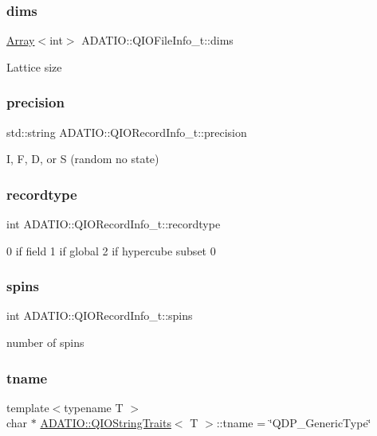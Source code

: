 \subsubsection{\texorpdfstring{dims}{dims}}
{\footnotesize\ttfamily \mbox{\hyperlink{classXMLArray_1_1Array}{Array}}$<$int$>$ A\+D\+A\+T\+I\+O\+::\+Q\+I\+O\+File\+Info\+\_\+t\+::dims}

Lattice size \mbox{\label{group__qio_gaba8466af5dd242de9e6d63fc5112e6df}} 
\subsubsection{\texorpdfstring{precision}{precision}}
{\footnotesize\ttfamily std\+::string A\+D\+A\+T\+I\+O\+::\+Q\+I\+O\+Record\+Info\+\_\+t\+::precision}

I, F, D, or S (random no state) \mbox{\label{group__qio_ga88cd070912edbe6d09a2437d3d9c6d08}} 
\subsubsection{\texorpdfstring{recordtype}{recordtype}}
{\footnotesize\ttfamily int A\+D\+A\+T\+I\+O\+::\+Q\+I\+O\+Record\+Info\+\_\+t\+::recordtype}

0 if field 1 if global 2 if hypercube subset 0 \mbox{\label{group__qio_ga1a819261ad8c96e3e9378fc74742b1f4}} 
\subsubsection{\texorpdfstring{spins}{spins}}
{\footnotesize\ttfamily int A\+D\+A\+T\+I\+O\+::\+Q\+I\+O\+Record\+Info\+\_\+t\+::spins}

number of spins \mbox{\label{group__qio_ga14189398447447c3ff6d039d05033619}} 
\subsubsection{\texorpdfstring{tname}{tname}\hspace{0.1cm}{\footnotesize\ttfamily [1/3]}}
{\footnotesize\ttfamily template$<$typename T $>$ \\
char $\ast$ \mbox{\hyperlink{structADATIO_1_1QIOStringTraits}{A\+D\+A\+T\+I\+O\+::\+Q\+I\+O\+String\+Traits}}$<$ T $>$\+::tname = \char`\"{}Q\+D\+P\+\_\+\+Generic\+Type\char`\"{}\hspace{0.3cm}{\ttfamily [static]}}



